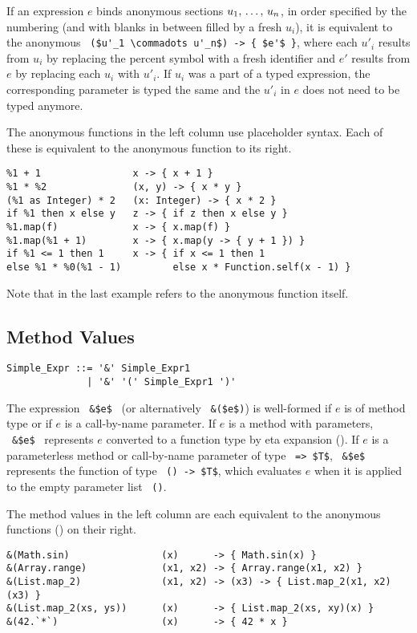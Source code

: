 If an expression $e$ binds anonymous sections $u_1 ,\, \ldots ,\, u_n$, in order specified by the numbering (and with blanks in between filled by a fresh $u_i$), it is equivalent to the anonymous ~\lstinline!($u'_1 \commadots u'_n$) -> { $e'$ }!, where each $u'_i$ results from $u_i$ by replacing the percent symbol with a fresh identifier and $e'$ results from $e$ by replacing each $u_i$ with $u'_i$. If $u_i$ was a part of a typed expression, the corresponding parameter is typed the same and the $u'_i$ in $e$ does not need to be typed anymore. 

\example The anonymous functions in the left column use placeholder syntax. Each of these is equivalent to the anonymous function to its right. 
\begin{lstlisting}
%1 + 1                x -> { x + 1 }
%1 * %2               (x, y) -> { x * y }
(%1 as Integer) * 2   (x: Integer) -> { x * 2 }
if %1 then x else y   z -> { if z then x else y }
%1.map(f)             x -> { x.map(f) }
%1.map(%1 + 1)        x -> { x.map(y -> { y + 1 }) }
if %1 <= 1 then 1     x -> { if x <= 1 then 1 
else %1 * %0(%1 - 1)         else x * Function.self(x - 1) }     
\end{lstlisting}
Note that  in the last example refers to the anonymous function itself. 





\subsection{Method Values}
\label{sec:method-values}

\syntax\begin{lstlisting}
Simple_Expr ::= '&' Simple_Expr1
              | '&' '(' Simple_Expr1 ')'
\end{lstlisting}

The expression ~\lstinline!&$e$!~ (or alternatively ~\lstinline!&($e$)!) is well-formed if $e$ is of method type or if $e$ is a call-by-name parameter. If $e$ is a method with parameters, ~\lstinline!&$e$!~ represents $e$ converted to a function type by eta expansion (). If $e$ is a parameterless method or call-by-name parameter of type ~\lstinline!=> $T$!, ~\lstinline!&$e$!~ represents the function of type ~\lstinline!() -> $T$!, which evaluates $e$ when it is applied to the empty parameter list ~\lstinline!()!. 

\example The method values in the left column are each equivalent to the anonymous functions () on their right. 
\begin{lstlisting}[deletekeywords={range}]
&(Math.sin)                (x)      -> { Math.sin(x) }
&(Array.range)             (x1, x2) -> { Array.range(x1, x2) }
&(List.map_2)              (x1, x2) -> (x3) -> { List.map_2(x1, x2)(x3) }
&(List.map_2(xs, ys))      (x)      -> { List.map_2(xs, xy)(x) }
&(42.`*`)                  (x)      -> { 42 * x }
\end{lstlisting}

